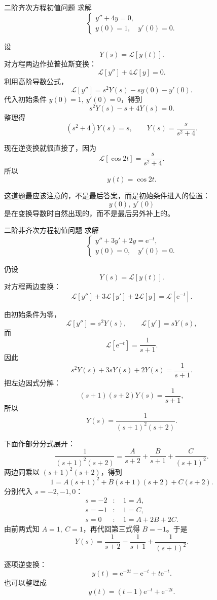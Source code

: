 \begin{lizi}{二阶齐次方程初值问题}{}
求解
\[
    \begin{cases}
        y''+4y=0,\\
        y(0)=1,\quad y'(0)=0.
    \end{cases}
\]

\begin{jie}
设
\[
    Y(s)=\mathcal{L}[y(t)].
\]
对方程两边作拉普拉斯变换：
\[
    \mathcal{L}[y'']+4\mathcal{L}[y]=0.
\]
利用高阶导数公式，
\[
    \mathcal{L}[y'']
    =
    s^2Y(s)-sy(0)-y'(0).
\]
代入初始条件 $y(0)=1,\ y'(0)=0$，得到
\[
    s^2Y(s)-s+4Y(s)=0.
\]
整理得
\[
    (s^2+4)Y(s)=s,
    \qquad
    Y(s)=\frac{s}{s^2+4}.
\]

现在逆变换就很直接了，因为
\[
    \mathcal{L}[\cos 2t]
    =
    \frac{s}{s^2+4}.
\]
所以
\[
    y(t)=\cos 2t.
\]

这道题最应该注意的，不是最后答案，而是初始条件进入的位置：
\[
    y(0),\ y'(0)
\]
是在变换导数时自然出现的，而不是最后另外补上的。
\end{jie}
\end{lizi}

\begin{lizi}{二阶非齐次方程初值问题}{}
求解
\[
    \begin{cases}
        y''+3y'+2y=\mathrm{e}^{-t},\\
        y(0)=0,\quad y'(0)=0.
    \end{cases}
\]

\begin{jie}
仍设
\[
    Y(s)=\mathcal{L}[y(t)].
\]
对方程两边变换：
\[
    \mathcal{L}[y'']+3\mathcal{L}[y']+2\mathcal{L}[y]
    =
    \mathcal{L}[\mathrm{e}^{-t}].
\]

由初始条件为零，
\[
    \mathcal{L}[y'']=s^2Y(s),\qquad \mathcal{L}[y']=sY(s),
\]
而
\[
    \mathcal{L}[\mathrm{e}^{-t}]
    =
    \frac{1}{s+1}.
\]
因此
\[
    s^2Y(s)+3sY(s)+2Y(s)=\frac{1}{s+1}.
\]
把左边因式分解：
\[
    (s+1)(s+2)Y(s)=\frac{1}{s+1},
\]
所以
\[
    Y(s)=\frac{1}{(s+1)^2(s+2)}.
\]

下面作部分分式展开：
\[
    \frac{1}{(s+1)^2(s+2)}
    =
    \frac{A}{s+2}
    +
    \frac{B}{s+1}
    +
    \frac{C}{(s+1)^2}.
\]
两边同乘以 $(s+1)^2(s+2)$，得到
\[
    1
    =
    A(s+1)^2+B(s+1)(s+2)+C(s+2).
\]
分别代入 $s=-2,-1,0$：
\begin{align}
    s=-2 &:\quad 1=A,\\
    s=-1 &:\quad 1=C,\\
    s=0 &:\quad 1=A+2B+2C.
\end{align}
由前两式知 $A=1,\ C=1$，再代回第三式得 $B=-1$。于是
\[
    Y(s)
    =
    \frac{1}{s+2}
    -
    \frac{1}{s+1}
    +
    \frac{1}{(s+1)^2}.
\]

逐项逆变换：
\[
    y(t)
    =
    \mathrm{e}^{-2t}
    -
    \mathrm{e}^{-t}
    +
    t\mathrm{e}^{-t}.
\]
也可以整理成
\[
    y(t)
    =
    (t-1)\mathrm{e}^{-t}+\mathrm{e}^{-2t}.
\]
\end{jie}
\end{lizi}

